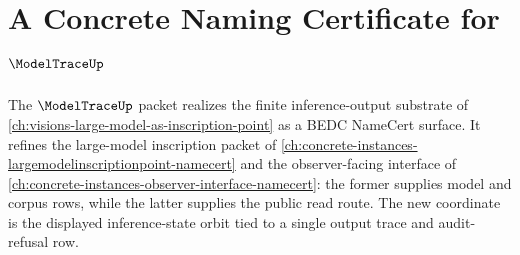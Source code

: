 \chapter{A Concrete Naming Certificate for $\ModelTraceUp$}
\label{ch:concrete-instances-modeltrace-namecert}

The $\ModelTraceUp$ packet realizes the finite inference-output substrate of \autoref{ch:visions-large-model-as-inscription-point} as a BEDC NameCert surface. It refines the large-model inscription packet of \autoref{ch:concrete-instances-largemodelinscriptionpoint-namecert} and the observer-facing interface of \autoref{ch:concrete-instances-observer-interface-namecert}: the former supplies model and corpus rows, while the latter supplies the public read route. The new coordinate is the displayed inference-state orbit tied to a single output trace and audit-refusal row.


